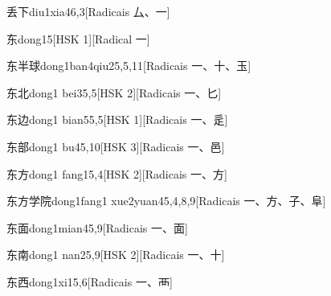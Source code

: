 \begin{entry}{丢下}{diu1xia4}{6,3}[Radicais ⼛、⼀]
\end{entry}

\begin{entry}{东}{dong1}{5}[HSK 1][Radical ⼀]
\end{entry}

\begin{entry}{东半球}{dong1ban4qiu2}{5,5,11}[Radicais ⼀、⼗、⽟]
\end{entry}

\begin{entry}{东北}{dong1 bei3}{5,5}[HSK 2][Radicais ⼀、⼔]
\end{entry}

\begin{entry}{东边}{dong1 bian5}{5,5}[HSK 1][Radicais ⼀、⾡]
\end{entry}

\begin{entry}{东部}{dong1 bu4}{5,10}[HSK 3][Radicais ⼀、⾢]
\end{entry}

\begin{entry}{东方}{dong1 fang1}{5,4}[HSK 2][Radicais ⼀、⽅]
\end{entry}

\begin{entry}{东方学院}{dong1fang1 xue2yuan4}{5,4,8,9}[Radicais ⼀、⽅、⼦、⾩]
\end{entry}

\begin{entry}{东面}{dong1mian4}{5,9}[Radicais ⼀、⾯]
\end{entry}

\begin{entry}{东南}{dong1 nan2}{5,9}[HSK 2][Radicais ⼀、⼗]
\end{entry}

\begin{entry}{东西}{dong1xi1}{5,6}[Radicais ⼀、⾑]
\end{entry}

